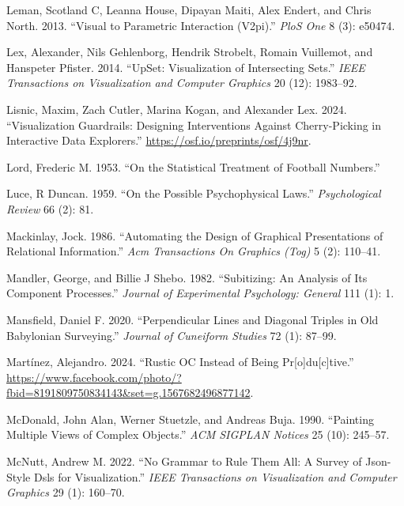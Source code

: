 \documentclass[
]{book}
\newlength{\cslhangindent}
\newenvironment{CSLReferences}[2] %
 {\begin{list}{}{%
  \setlength{\itemindent}{0pt}
  \setlength{\leftmargin}{0pt}
  \setlength{\parsep}{0pt}
  \ifodd #1
   \setlength{\leftmargin}{\cslhangindent}
   \setlength{\itemindent}{-1\cslhangindent}
  \fi
  \setlength{\itemsep}{#2\baselineskip}}}
 {\end{list}}
\theoremstyle{definition}
\theoremstyle{definition}
\theoremstyle{definition}
\theoremstyle{definition}
\theoremstyle{remark}
\begin{document}
\begin{CSLReferences}{1}{0}
Leman, Scotland C, Leanna House, Dipayan Maiti, Alex Endert, and Chris North. 2013. {``Visual to Parametric Interaction (V2pi).''} \emph{PloS One} 8 (3): e50474.

Lex, Alexander, Nils Gehlenborg, Hendrik Strobelt, Romain Vuillemot, and Hanspeter Pfister. 2014. {``UpSet: Visualization of Intersecting Sets.''} \emph{IEEE Transactions on Visualization and Computer Graphics} 20 (12): 1983--92.

Lisnic, Maxim, Zach Cutler, Marina Kogan, and Alexander Lex. 2024. {``Visualization Guardrails: Designing Interventions Against Cherry-Picking in Interactive Data Explorers.''} \url{https://osf.io/preprints/osf/4j9nr}.

Lord, Frederic M. 1953. {``On the Statistical Treatment of Football Numbers.''}

Luce, R Duncan. 1959. {``On the Possible Psychophysical Laws.''} \emph{Psychological Review} 66 (2): 81.

Mackinlay, Jock. 1986. {``Automating the Design of Graphical Presentations of Relational Information.''} \emph{Acm Transactions On Graphics (Tog)} 5 (2): 110--41.

Mandler, George, and Billie J Shebo. 1982. {``Subitizing: An Analysis of Its Component Processes.''} \emph{Journal of Experimental Psychology: General} 111 (1): 1.

Mansfield, Daniel F. 2020. {``Perpendicular Lines and Diagonal Triples in Old Babylonian Surveying.''} \emph{Journal of Cuneiform Studies} 72 (1): 87--99.

Martínez, Alejandro. 2024. {``Rustic OC Instead of Being Pr{[}o{]}du{[}c{]}tive.''} \url{https://www.facebook.com/photo/?fbid=8191809750834143&set=g.1567682496877142}.

McDonald, John Alan, Werner Stuetzle, and Andreas Buja. 1990. {``Painting Multiple Views of Complex Objects.''} \emph{ACM SIGPLAN Notices} 25 (10): 245--57.

McNutt, Andrew M. 2022. {``No Grammar to Rule Them All: A Survey of Json-Style Dsls for Visualization.''} \emph{IEEE Transactions on Visualization and Computer Graphics} 29 (1): 160--70.


\end{CSLReferences}
\end{document}

